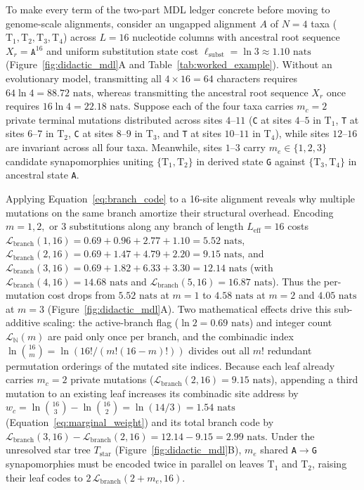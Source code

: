 \documentclass[11pt,a4paper]{article}
\begin{document}
To make every term of the two-part MDL ledger concrete before moving to genome-scale alignments, consider an ungapped alignment $A$ of $N = 4$ taxa ($\text{T}_1, \text{T}_2, \text{T}_3, \text{T}_4$) across $L = 16$ nucleotide columns with ancestral root sequence $X_r = \texttt{A}^{16}$ and uniform substitution state cost $\ell_{\text{subst}} = \ln 3 \approx 1.10\text{ nats}$ (Figure~\ref{fig:didactic_mdl}A and Table~\ref{tab:worked_example}). Without an evolutionary model, transmitting all $4 \times 16 = 64$ characters requires $64 \ln 4 = 88.72\text{ nats}$, whereas transmitting the ancestral root sequence $X_r$ once requires $16 \ln 4 = 22.18\text{ nats}$. Suppose each of the four taxa carries $m_c = 2$ private terminal mutations distributed across sites $4\text{--}11$ (\texttt{C} at sites $4\text{--}5$ in $\text{T}_1$, \texttt{T} at sites $6\text{--}7$ in $\text{T}_2$, \texttt{C} at sites $8\text{--}9$ in $\text{T}_3$, and \texttt{T} at sites $10\text{--}11$ in $\text{T}_4$), while sites $12\text{--}16$ are invariant across all four taxa. Meanwhile, sites $1\text{--}3$ carry $m_e \in \{1, 2, 3\}$ candidate synapomorphies uniting $\{\text{T}_1, \text{T}_2\}$ in derived state \texttt{G} against $\{\text{T}_3, \text{T}_4\}$ in ancestral state \texttt{A}.

Applying Equation~\eqref{eq:branch_code} to a 16-site alignment reveals why multiple mutations on the same branch amortize their structural overhead. Encoding $m = 1, 2,$ or $3$ substitutions along any branch of length $L_{\text{eff}} = 16$ costs $\mathcal{L}_{\text{branch}}(1, 16) = 0.69 + 0.96 + 2.77 + 1.10 = 5.52\text{ nats}$, $\mathcal{L}_{\text{branch}}(2, 16) = 0.69 + 1.47 + 4.79 + 2.20 = 9.15\text{ nats}$, and $\mathcal{L}_{\text{branch}}(3, 16) = 0.69 + 1.82 + 6.33 + 3.30 = 12.14\text{ nats}$ (with $\mathcal{L}_{\text{branch}}(4, 16) = 14.68\text{ nats}$ and $\mathcal{L}_{\text{branch}}(5, 16) = 16.87\text{ nats}$). Thus the per-mutation cost drops from $5.52\text{ nats}$ at $m = 1$ to $4.58\text{ nats}$ at $m = 2$ and $4.05\text{ nats}$ at $m = 3$ (Figure~\ref{fig:didactic_mdl}A). Two mathematical effects drive this sub-additive scaling: the active-branch flag ($\ln 2 = 0.69\text{ nats}$) and integer count $\mathcal{L}_{\mathbb{N}}(m)$ are paid only once per branch, and the combinadic index $\ln\binom{16}{m} = \ln(16! / (m!(16-m)!))$ divides out all $m!$ redundant permutation orderings of the mutated site indices. Because each leaf already carries $m_c = 2$ private mutations ($\mathcal{L}_{\text{branch}}(2, 16) = 9.15\text{ nats}$), appending a third mutation to an existing leaf increases its combinadic site address by $w_c = \ln\binom{16}{3} - \ln\binom{16}{2} = \ln(14/3) = 1.54\text{ nats}$ (Equation~\eqref{eq:marginal_weight}) and its total branch code by $\mathcal{L}_{\text{branch}}(3, 16) - \mathcal{L}_{\text{branch}}(2, 16) = 12.14 - 9.15 = 2.99\text{ nats}$. Under the unresolved star tree $T_{\text{star}}$ (Figure~\ref{fig:didactic_mdl}B), $m_e$ shared \texttt{A}$\to$\texttt{G} synapomorphies must be encoded twice in parallel on leaves $\text{T}_1$ and $\text{T}_2$, raising their leaf codes to $2\,\mathcal{L}_{\text{branch}}(2 + m_e, 16)$.
\end{document}
